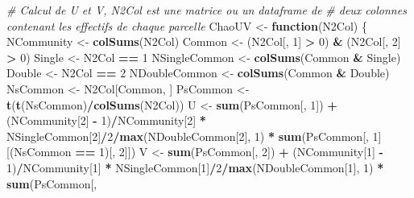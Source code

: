 \documentclass[
  11pt,
  french,
  a4paper,
  extrafontsizes,onecolumn,openright
  ]{memoir}
\newenvironment{Shaded}{\begin{snugshade}}{\end{snugshade}}
\newcommand{\CommentTok}[1]{\textcolor[rgb]{0.56,0.35,0.01}{\textit{#1}}}
\newcommand{\ControlFlowTok}[1]{\textcolor[rgb]{0.13,0.29,0.53}{\textbf{#1}}}
\newcommand{\DecValTok}[1]{\textcolor[rgb]{0.00,0.00,0.81}{#1}}
\newcommand{\KeywordTok}[1]{\textcolor[rgb]{0.13,0.29,0.53}{\textbf{#1}}}
\newcommand{\NormalTok}[1]{#1}
\newcommand{\OperatorTok}[1]{\textcolor[rgb]{0.81,0.36,0.00}{\textbf{#1}}}
\newcommand{\StringTok}[1]{\textcolor[rgb]{0.31,0.60,0.02}{#1}}
\begin{document}
\begin{Shaded}
\begin{Highlighting}[]
\CommentTok{# Calcul de U et V, N2Col est une matrice ou un dataframe de}
\CommentTok{# deux colonnes contenant les effectifs de chaque parcelle}
\NormalTok{ChaoUV <-}\StringTok{ }\ControlFlowTok{function}\NormalTok{(N2Col) \{}
\NormalTok{    NCommunity <-}\StringTok{ }\KeywordTok{colSums}\NormalTok{(N2Col)}
\NormalTok{    Common <-}\StringTok{ }\NormalTok{(N2Col[, }\DecValTok{1}\NormalTok{] }\OperatorTok{>}\StringTok{ }\DecValTok{0}\NormalTok{) }\OperatorTok{&}\StringTok{ }\NormalTok{(N2Col[, }\DecValTok{2}\NormalTok{] }\OperatorTok{>}\StringTok{ }\DecValTok{0}\NormalTok{)}
\NormalTok{    Single <-}\StringTok{ }\NormalTok{N2Col }\OperatorTok{==}\StringTok{ }\DecValTok{1}
\NormalTok{    NSingleCommon <-}\StringTok{ }\KeywordTok{colSums}\NormalTok{(Common }\OperatorTok{&}\StringTok{ }\NormalTok{Single)}
\NormalTok{    Double <-}\StringTok{ }\NormalTok{N2Col }\OperatorTok{==}\StringTok{ }\DecValTok{2}
\NormalTok{    NDoubleCommon <-}\StringTok{ }\KeywordTok{colSums}\NormalTok{(Common }\OperatorTok{&}\StringTok{ }\NormalTok{Double)}
\NormalTok{    NsCommon <-}\StringTok{ }\NormalTok{N2Col[Common, ]}
\NormalTok{    PsCommon <-}\StringTok{ }\KeywordTok{t}\NormalTok{(}\KeywordTok{t}\NormalTok{(NsCommon)}\OperatorTok{/}\KeywordTok{colSums}\NormalTok{(N2Col))}
\NormalTok{    U <-}\StringTok{ }\KeywordTok{sum}\NormalTok{(PsCommon[, }\DecValTok{1}\NormalTok{]) }\OperatorTok{+}\StringTok{ }\NormalTok{(NCommunity[}\DecValTok{2}\NormalTok{] }\OperatorTok{-}\StringTok{ }\DecValTok{1}\NormalTok{)}\OperatorTok{/}\NormalTok{NCommunity[}\DecValTok{2}\NormalTok{] }\OperatorTok{*}\StringTok{ }
\StringTok{        }\NormalTok{NSingleCommon[}\DecValTok{2}\NormalTok{]}\OperatorTok{/}\DecValTok{2}\OperatorTok{/}\KeywordTok{max}\NormalTok{(NDoubleCommon[}\DecValTok{2}\NormalTok{], }\DecValTok{1}\NormalTok{) }\OperatorTok{*}\StringTok{ }\KeywordTok{sum}\NormalTok{(PsCommon[, }
        \DecValTok{1}\NormalTok{][(NsCommon }\OperatorTok{==}\StringTok{ }\DecValTok{1}\NormalTok{)[, }\DecValTok{2}\NormalTok{]])}
\NormalTok{    V <-}\StringTok{ }\KeywordTok{sum}\NormalTok{(PsCommon[, }\DecValTok{2}\NormalTok{]) }\OperatorTok{+}\StringTok{ }\NormalTok{(NCommunity[}\DecValTok{1}\NormalTok{] }\OperatorTok{-}\StringTok{ }\DecValTok{1}\NormalTok{)}\OperatorTok{/}\NormalTok{NCommunity[}\DecValTok{1}\NormalTok{] }\OperatorTok{*}\StringTok{ }
\StringTok{        }\NormalTok{NSingleCommon[}\DecValTok{1}\NormalTok{]}\OperatorTok{/}\DecValTok{2}\OperatorTok{/}\KeywordTok{max}\NormalTok{(NDoubleCommon[}\DecValTok{1}\NormalTok{], }\DecValTok{1}\NormalTok{) }\OperatorTok{*}\StringTok{ }\KeywordTok{sum}\NormalTok{(PsCommon[, }

\end{Highlighting}
\end{Shaded}
\end{document}
